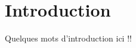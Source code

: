 \documentclass{standalone}
\begin{document}
\section{Introduction}
Quelques mots d'introduction ici !!
\end{document}
